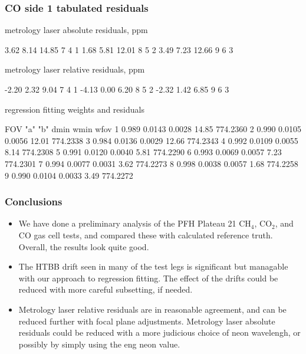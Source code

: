 \documentclass[10pt]{beamer}
\begin{document}
\begin{frame}[fragile]
\frametitle{CO side 1 tabulated residuals}

  metrology laser absolute residuals, ppm
\begin{semiverbatim}\scriptsize
      3.62     8.14    14.85         7   4   1
      1.68     5.81    12.01         8   5   2
      3.49     7.23    12.66         9   6   3
\end{semiverbatim}

  metrology laser relative residuals, ppm
\begin{semiverbatim}\scriptsize
     -2.20     2.32     9.04         7   4   1
     -4.13     0.00     6.20         8   5   2
     -2.32     1.42     6.85         9   6   3
\end{semiverbatim}

     regression fitting weights and residuals
\begin{semiverbatim}\scriptsize
 FOV   "a"       "b"     dmin     wmin      wfov
  1   0.989    0.0143   0.0028    14.85   774.2360 
  2   0.990    0.0105   0.0056    12.01   774.2338 
  3   0.984    0.0136   0.0029    12.66   774.2343 
  4   0.992    0.0109   0.0055     8.14   774.2308 
  5   0.991    0.0120   0.0040     5.81   774.2290 
  6   0.993    0.0069   0.0057     7.23   774.2301 
  7   0.994    0.0077   0.0031     3.62   774.2273 
  8   0.998    0.0038   0.0057     1.68   774.2258 
  9   0.990    0.0104   0.0033     3.49   774.2272 
\end{semiverbatim}

\end{frame}
\begin{frame}
\frametitle{Conclusions}
\begin{itemize}

  \item We have done a preliminary analysis of the PFH Plateau 21
    CH$_4$, CO$_2$, and CO gas cell tests, and compared these with
    calculated reference truth.  Overall, the results look quite
    good.

  \item The HTBB drift seen in many of the test legs is significant
    but managable with our approach to regression fitting.   The effect
    of the drifts could be reduced with more careful subsetting, if
    needed.

  \item Metrology laser relative residuals are in reasonable
    agreement, and can be reduced further with focal plane
    adjustments.  Metrology laser absolute residuals could be
    reduced with a more judicious choice of neon wavelengh, or 
    possibly by simply using the eng neon value.

\end{itemize}
\end{frame}
\end{document}
